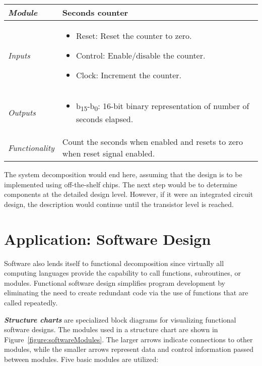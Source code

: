 \begin{table}[h]
\label{table:level1stopwatchSecondsCounter}
\begin{tabular}{|l|m{10cm}|}
\hline
\emph{Module} & Seconds counter\\ \hline
\emph{Inputs} & 
\begin{itemize}
\item
  Reset: Reset the counter to zero.
\item
  Control: Enable/disable the counter.
\item
  Clock: Increment the counter.
\end{itemize}\\ \hline

\emph{Outputs} & 
\begin{itemize}
\item
  b\textsubscript{15}-b\textsubscript{0}: 16-bit binary representation
  of number of seconds elapsed.
\end{itemize}\\ \hline
\emph{Functionality} & Count the seconds when enabled and resets to zero
when reset signal enabled. \\ \hline
\end{tabular}
\end{table}



The system decomposition would end here, assuming that the design is to
be implemented using off-the-shelf chips. The next step would be to
determine components at the detailed design level. However, if it were
an integrated circuit design, the description would continue until the
transistor level is reached.

\section{Application: Software Design}
\label{section:application-software-design}

Software also lends itself to functional decomposition since virtually
all computing languages provide the capability to call functions,
subroutines, or modules. Functional software design simplifies program
development by eliminating the need to create redundant code via the use
of functions that are called repeatedly.

\emph{\textbf{Structure charts}} are specialized block diagrams for
visualizing functional software designs. The modules used in a structure
chart are shown in 
Figure~\ref{figure:softwareModules}. The larger arrows indicate connections to
other modules, while the smaller arrows represent data and control
information passed between modules. Five basic modules are utilized:

